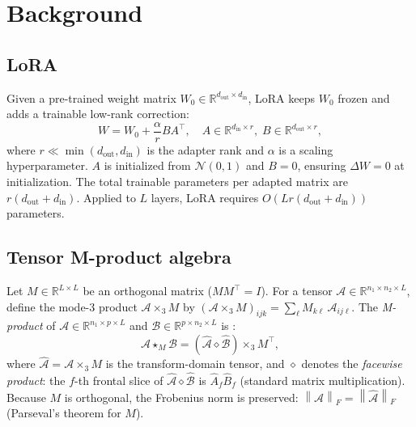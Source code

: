 \documentclass{article}
\newcommand{\R}{\mathbb{R}}
\newcommand{\cA}{\mathcal{A}}
\newcommand{\cB}{\mathcal{B}}
\newcommand{\mprod}{\star_M}
\newcommand{\norm}[1]{\left\|#1\right\|}
\newcommand{\transpose}{^{\!\top}}
\theoremstyle{plain}
\begin{document}
\section{Background}
\label{sec:background}

\subsection{LoRA}
\label{sec:lora}

Given a pre-trained weight matrix $W_0 \in \R^{d_{\mathrm{out}} \times d_{\mathrm{in}}}$,
LoRA \citep{hu2022lora} keeps $W_0$ frozen and adds a trainable low-rank correction:
\begin{equation}
  W = W_0 + \frac{\alpha}{r} B A\transpose, \quad
  A \in \R^{d_{\mathrm{in}} \times r},\; B \in \R^{d_{\mathrm{out}} \times r},
\end{equation}
where $r \ll \min(d_{\mathrm{out}}, d_{\mathrm{in}})$ is the adapter rank and
$\alpha$ is a scaling hyperparameter.
$A$ is initialized from $\mathcal{N}(0,1)$ and $B = 0$, ensuring $\Delta W = 0$
at initialization.
The total trainable parameters per adapted matrix are $r(d_{\mathrm{out}} + d_{\mathrm{in}})$.
Applied to $L$ layers, LoRA requires $O(Lr(d_{\mathrm{out}} + d_{\mathrm{in}}))$ parameters.

\subsection{Tensor M-product algebra}
\label{sec:mprod}

Let $M \in \R^{L \times L}$ be an orthogonal matrix ($MM\transpose = I$).
For a tensor $\cA \in \R^{n_1 \times n_2 \times L}$, define the mode-3 product
$\cA \times_3 M$ by $(\cA \times_3 M)_{ijk} = \sum_\ell M_{k\ell}\, \cA_{ij\ell}$.
The \emph{M-product} of $\cA \in \R^{n_1 \times p \times L}$ and
$\cB \in \R^{p \times n_2 \times L}$ is \citep{kernfeld2015tensor}:
\begin{equation}
  \cA \mprod \cB = (\hat{\cA} \diamond \hat{\cB}) \times_3 M\transpose,
  \label{eq:mprod}
\end{equation}
where $\hat{\cA} = \cA \times_3 M$ is the transform-domain tensor,
and $\diamond$ denotes the \emph{facewise product}: the $f$-th frontal slice of
$\hat{\cA} \diamond \hat{\cB}$ is $\hat{A}_f \hat{B}_f$ (standard matrix multiplication).
Because $M$ is orthogonal, the Frobenius norm is preserved:
$\norm{\cA}_F = \norm{\hat{\cA}}_F$ (Parseval's theorem for $M$).
\end{document}
